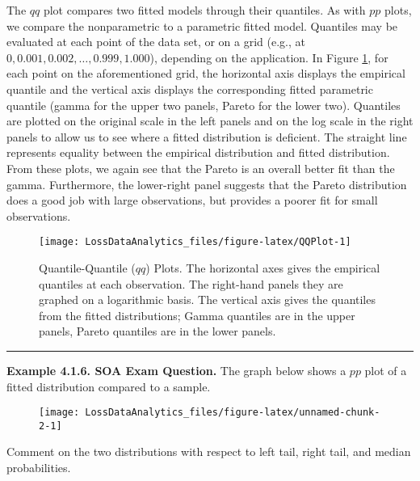 \documentclass[]{book}
\theoremstyle{definition}
\theoremstyle{definition}
\theoremstyle{definition}
\theoremstyle{remark}
\begin{document}
The \(qq\) plot compares two fitted models through their quantiles. As
with \(pp\) plots, we compare the nonparametric to a parametric fitted
model. Quantiles may be evaluated at each point of the data set, or on a
grid (e.g., at \(0, 0.001, 0.002, \ldots, 0.999, 1.000\)), depending on
the application. In Figure \ref{fig:QQPlot}, for each point on the
aforementioned grid, the horizontal axis displays the empirical quantile
and the vertical axis displays the corresponding fitted parametric
quantile (gamma for the upper two panels, Pareto for the lower two).
Quantiles are plotted on the original scale in the left panels and on
the log scale in the right panels to allow us to see where a fitted
distribution is deficient. The straight line represents equality between
the empirical distribution and fitted distribution. From these plots, we
again see that the Pareto is an overall better fit than the gamma.
Furthermore, the lower-right panel suggests that the Pareto distribution
does a good job with large observations, but provides a poorer fit for
small observations.

\begin{figure}

{\centering \texttt{[image: LossDataAnalytics\_files/figure-latex/QQPlot-1]} 

}

\caption{Quantile-Quantile ($qq$) Plots. The horizontal axes gives the empirical quantiles at each observation. The right-hand panels they are graphed on a logarithmic basis. The vertical axis gives the quantiles from the fitted distributions; Gamma quantiles are in the upper panels, Pareto quantiles are in the lower panels.}\label{fig:QQPlot}
\end{figure}

\begin{center}\rule{0.5\linewidth}{\linethickness}\end{center}

\textbf{Example 4.1.6. SOA Exam Question.} The graph below shows a
\(pp\) plot of a fitted distribution compared to a sample.

\begin{figure}

{\centering \texttt{[image: LossDataAnalytics\_files/figure-latex/unnamed-chunk-2-1]} 

}

\end{figure}

Comment on the two distributions with respect to left tail, right tail,
and median probabilities.
\end{document}

